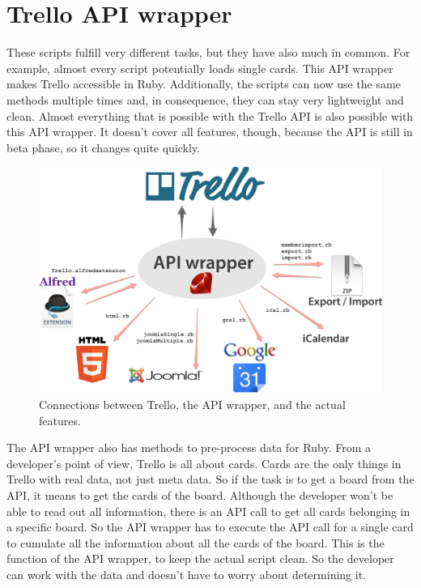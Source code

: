 \onehalfspacing
\chapter{Trello API wrapper}\label{apiwrapper}

These scripts fulfill very different tasks, but they have also much in common. For example, almost every script potentially loads single cards. This API wrapper makes Trello accessible in Ruby. Additionally, the scripts can now use the same methods multiple times and, in consequence, they can stay very lightweight and clean. Almost everything that is possible with the Trello API is also possible with this API wrapper. It doesn't cover all features, though, because the API is still in beta phase, so it changes quite quickly.

\begin{figure}
\centering
\includegraphics[width=\textwidth]{figures/api-wrapper}
\caption{Connections between Trello, the API wrapper, and the actual features. \cite{ruby:icon}\cite{html:logo}\cite{joomla}\cite{google} }
\label{fig: api-wrapper}
\end{figure}

The API wrapper also has methods to pre-process data for Ruby. From a developer's point of view, Trello is all about cards. Cards are the only things in Trello with real data, not just meta data. So if the task is to get a board from the API, it means to get the cards of the board. Although the developer won't be able to read out all information, there is an API call to get all cards belonging in a specific board. So the API wrapper has to execute the API call for a single card to cumulate all the information about all the cards of the board. This is the function of the API wrapper, to keep the actual script clean. So the developer can work with the data and doesn't have to worry about determining it.

